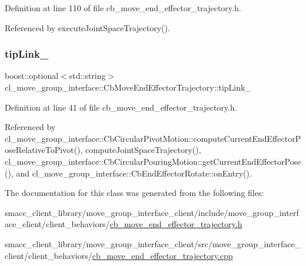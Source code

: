 Definition at line 110 of file cb\+\_\+move\+\_\+end\+\_\+effector\+\_\+trajectory.\+h.



Referenced by execute\+Joint\+Space\+Trajectory().

\mbox{\label{classcl__move__group__interface_1_1CbMoveEndEffectorTrajectory_a24c6c30b9b0761a61fa002d947bd3e11}} 
\subsubsection{\texorpdfstring{tip\+Link\+\_\+}{tipLink\_}}
{\footnotesize\ttfamily boost\+::optional$<$std\+::string$>$ cl\+\_\+move\+\_\+group\+\_\+interface\+::\+Cb\+Move\+End\+Effector\+Trajectory\+::tip\+Link\+\_\+}



Definition at line 41 of file cb\+\_\+move\+\_\+end\+\_\+effector\+\_\+trajectory.\+h.



Referenced by cl\+\_\+move\+\_\+group\+\_\+interface\+::\+Cb\+Circular\+Pivot\+Motion\+::compute\+Current\+End\+Effector\+Pose\+Relative\+To\+Pivot(), compute\+Joint\+Space\+Trajectory(), cl\+\_\+move\+\_\+group\+\_\+interface\+::\+Cb\+Circular\+Pouring\+Motion\+::get\+Current\+End\+Effector\+Pose(), and cl\+\_\+move\+\_\+group\+\_\+interface\+::\+Cb\+End\+Effector\+Rotate\+::on\+Entry().



The documentation for this class was generated from the following files\+:\begin{DoxyCompactItemize}
\item 
smacc\+\_\+client\+\_\+library/move\+\_\+group\+\_\+interface\+\_\+client/include/move\+\_\+group\+\_\+interface\+\_\+client/client\+\_\+behaviors/\hyperlink{cb__move__end__effector__trajectory_8h}{cb\+\_\+move\+\_\+end\+\_\+effector\+\_\+trajectory.\+h}\item 
smacc\+\_\+client\+\_\+library/move\+\_\+group\+\_\+interface\+\_\+client/src/move\+\_\+group\+\_\+interface\+\_\+client/client\+\_\+behaviors/\hyperlink{cb__move__end__effector__trajectory_8cpp}{cb\+\_\+move\+\_\+end\+\_\+effector\+\_\+trajectory.\+cpp}\end{DoxyCompactItemize}
